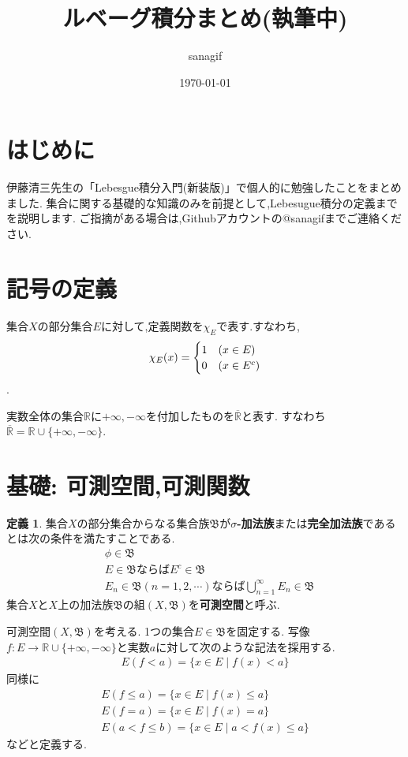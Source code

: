 \documentclass[a4paper,dvipdfmx]{jsarticle}
\title{ルベーグ積分まとめ(執筆中)}
\author{sanagif}
\date{\today}
\theoremstyle{definition}
\newtheorem{definition}[theorem]{定義}
\newcommand{\Bee}{\mathfrak{B}}
\newcommand{\R}{\mathbb{R}}
\newcommand{\RR}{\overline{\mathbb{R}}}
\begin{document}
\maketitle

\section*{はじめに}
伊藤清三先生の「Lebesgue積分入門(新装版)」で個人的に勉強したことをまとめました.
集合に関する基礎的な知識のみを前提として,Lebesugue積分の定義までを説明します.
ご指摘がある場合は,Githubアカウントの@sanagifまでご連絡ください.

\section{記号の定義}
集合$X$の部分集合$E$に対して,定義関数を$\chi_{E}$で表す.すなわち,
\begin{align}
    \chi_{E}(x) =
    \begin{cases}
        1 & (x \in E) \\
        0 & (x \in E^c)
    \end{cases}\notag
\end{align}.
\par

実数全体の集合$\R$に$+\infty,-\infty$を付加したものを$\RR$と表す.
すなわち$\RR = \R \cup \{+\infty, -\infty\}$.
\section{基礎: 可測空間,可測関数}
\begin{tcolorbox}
\begin{definition}
    集合$X$の部分集合からなる集合族$\Bee$が\textbf{$\sigma$-加法族}または\textbf{完全加法族}であるとは次の条件を満たすことである.
\begin{align}
    &\phi \in \Bee \\
    &E \in \Bee ならば E^c \in \Bee \\
    &E_n \in \Bee (n = 1, 2, \cdots) ならば \bigcup_{n=1}^{\infty} E_n \in \Bee
\end{align}
集合$X$と$X$上の加法族$\Bee$の組$(X,\Bee)$を\textbf{可測空間}と呼ぶ.
\end{definition}
\end{tcolorbox}

\par

可測空間$(X,\Bee)$を考える.
1つの集合$E \in \Bee$を固定する.
写像$f: E \to \R \cup \{+\infty, -\infty\}$と実数$a$に対して次のような記法を採用する.
\begin{align}
    E(f < a) = \{ x \in E \mid f(x) < a\}
\end{align}
同様に
\begin{align}
    E(f \le a) = \{ x \in E \mid f(x) \le a\} \\
    E(f = a) = \{ x \in E \mid f(x) = a\} \\
    E(a < f \le b) = \{ x \in E \mid a < f(x) \le a\}
\end{align}
などと定義する.
\end{document}
